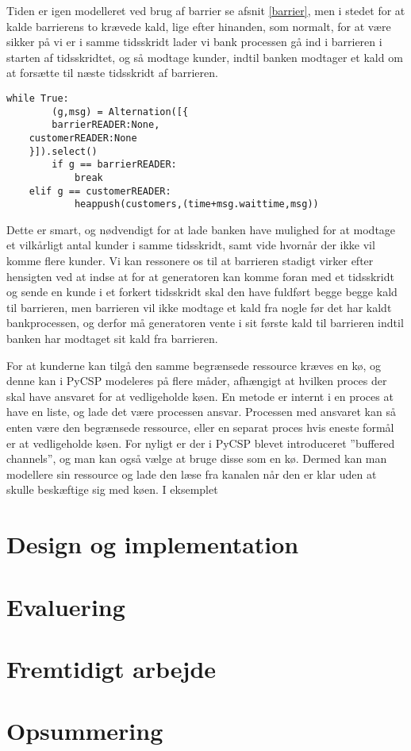 Tiden er igen modelleret ved brug af barrier se afsnit \vref{barrier}, men 
i stedet for  at kalde barrierens to krævede kald, lige efter hinanden, som 
normalt, for at være sikker på vi er i samme tidsskridt lader vi bank
processen gå ind i barrieren i starten af tidsskridtet, og så modtage kunder, 
indtil banken modtager et kald om at forsætte til næste tidsskridt af 
barrieren.
\begin{lstlisting}[label=bank-alternation-imp,caption=Modtage en kunde eller 
	barrier i Bankprocessen]
while True:
		(g,msg) = Alternation([{
		barrierREADER:None,
    customerREADER:None
    }]).select()
		if g == barrierREADER:
			break
    elif g == customerREADER:
			heappush(customers,(time+msg.waittime,msg))
\end{lstlisting}
Dette er smart, og nødvendigt for at lade banken have mulighed for at modtage 
et vilkårligt antal kunder i samme tidsskridt, samt vide hvornår der ikke vil  
komme flere kunder. Vi kan ressonere os til at barrieren stadigt virker efter 
hensigten ved at indse at for at generatoren kan komme foran med et tidsskridt og sende en 
kunde i et forkert tidsskridt skal den have fuldført begge begge kald til barrieren, men 
barrieren vil ikke modtage et kald fra nogle før det har kaldt bankprocessen, 
og derfor må generatoren vente i sit første kald til barrieren indtil banken har 
modtaget sit kald fra barrieren. 

For at kunderne kan tilgå den samme begrænsede ressource kræves en kø, og denne kan i PyCSP modeleres på flere måder, afhængigt at hvilken proces der skal have ansvaret for at vedligeholde køen. En metode er internt i en proces at have en liste, og lade det være processen ansvar. Processen med ansvaret kan så enten være den begrænsede ressource, eller en separat proces hvis eneste formål er at vedligeholde køen. For nyligt er der i PyCSP blevet introduceret ''buffered channels'', og man kan også vælge at bruge disse som en kø. Dermed kan man modellere sin ressource og lade den læse fra kanalen når den er klar uden at skulle beskæftige sig med køen. I eksemplet 
  \section{Design og implementation}
    
  \section{Evaluering}
  \section{Fremtidigt arbejde}
  \section{Opsummering}
